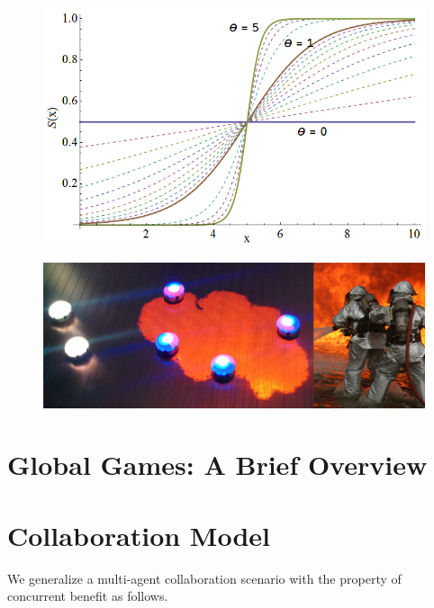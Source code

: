 \documentclass[conference]{IEEETran}
\begin{document}
\begin{figure}[!ht]
\centering\includegraphics[width=\columnwidth]{../figures/sigmoid1.png}
\centering\caption{}\label{fig:sigmoid}
\end{figure}

\begin{figure}[!ht]
\centering\includegraphics[width=\textwidth]{../figures/dropletfire.png}
\centering\caption{}\label{fig:dropletfire}
\end{figure}

\section{Global Games: A Brief Overview}



\section{Collaboration Model}
We generalize a multi-agent collaboration scenario with the property of concurrent benefit as follows.
\end{document}
